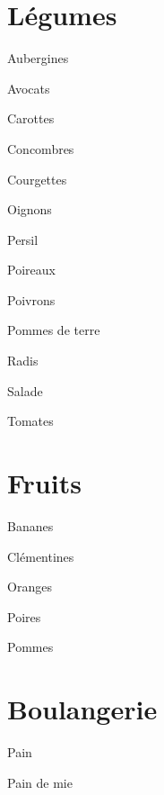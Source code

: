 \documentclass[8pt,landscape,a4paper]{article}
\begin{document}
\small

\begin{multicols*}{4}

    \section{Légumes}
    \begin{todolist}
    \item Aubergines
    \item Avocats
    \item Carottes
    \item Concombres
    \item Courgettes
    \item Oignons
    \item Persil 
    \item Poireaux
    \item Poivrons
    \item Pommes de terre
    \item Radis
    \item Salade
    \item Tomates
    \item
    \item
    \item
    \item
    \end{todolist}
    
    \section{Fruits}
    \begin{todolist}
    \item Bananes
    \item Clémentines
    \item Oranges
    \item Poires
    \item Pommes
    \item
    \item
    \item
    \item
    \item
    \item
    \end{todolist}

    \section{Boulangerie}
    \begin{todolist}
    \item Pain
    \item Pain de mie
    \item 
    \item 
    \item 
    \item 
    \end{todolist}


\end{multicols*}
\end{document}
